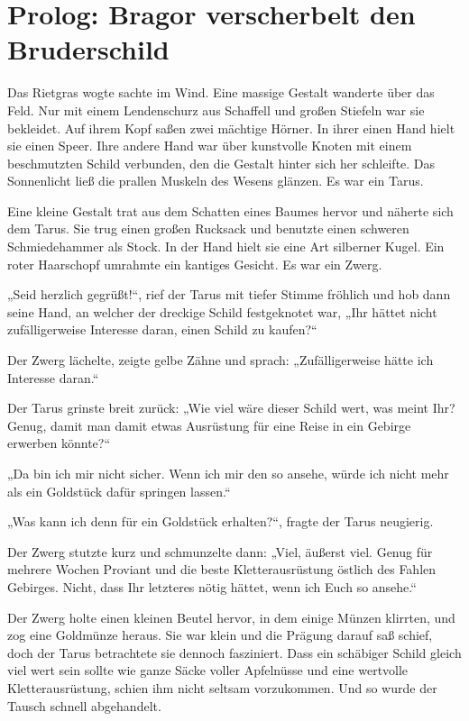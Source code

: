 \newpage
\section{Prolog: Bragor verscherbelt den Bruderschild}


Das Rietgras wogte sachte im Wind. Eine massige Gestalt wanderte über das Feld. Nur mit einem Lendenschurz aus Schaffell und großen Stiefeln war sie bekleidet. Auf ihrem Kopf saßen zwei mächtige Hörner. In ihrer einen Hand hielt sie einen Speer. Ihre andere Hand war über kunstvolle Knoten mit einem beschmutzten Schild verbunden, den die Gestalt hinter sich her schleifte. Das Sonnenlicht ließ die prallen Muskeln des Wesens glänzen. Es war ein Tarus.

Eine kleine Gestalt trat aus dem Schatten eines Baumes hervor und näherte sich dem Tarus. Sie trug einen großen Rucksack und benutzte einen schweren Schmiedehammer als Stock. In der Hand hielt sie eine Art silberner Kugel. Ein roter Haarschopf umrahmte ein kantiges Gesicht. Es war ein Zwerg.

„Seid herzlich gegrüßt!“, rief der Tarus mit tiefer Stimme fröhlich und hob dann seine Hand, an welcher der dreckige Schild festgeknotet war, „Ihr hättet nicht zufälligerweise Interesse daran, einen Schild zu kaufen?“

Der Zwerg lächelte, zeigte gelbe Zähne und sprach: „Zufälligerweise hätte ich Interesse daran.“

Der Tarus grinste breit zurück: „Wie viel wäre dieser Schild wert, was meint Ihr? Genug, damit man damit etwas Ausrüstung für eine Reise in ein Gebirge erwerben könnte?“

„Da bin ich mir nicht sicher. Wenn ich mir den so ansehe, würde ich nicht mehr als ein Goldstück dafür springen lassen.“

„Was kann ich denn für ein Goldstück erhalten?“, fragte der Tarus neugierig.

Der Zwerg stutzte kurz und schmunzelte dann: „Viel, äußerst viel. Genug für mehrere Wochen Proviant und die beste Kletterausrüstung östlich des Fahlen Gebirges. Nicht, dass Ihr letzteres nötig hättet, wenn ich Euch so ansehe.“

Der Zwerg holte einen kleinen Beutel hervor, in dem einige Münzen klirrten, und zog eine Goldmünze heraus. Sie war klein und die Prägung darauf saß schief, doch der Tarus betrachtete sie dennoch fasziniert. Dass ein schäbiger Schild gleich viel wert sein sollte wie ganze Säcke voller Apfelnüsse und eine wertvolle Kletterausrüstung, schien ihm nicht seltsam vorzukommen. Und so wurde der Tausch schnell abgehandelt.

